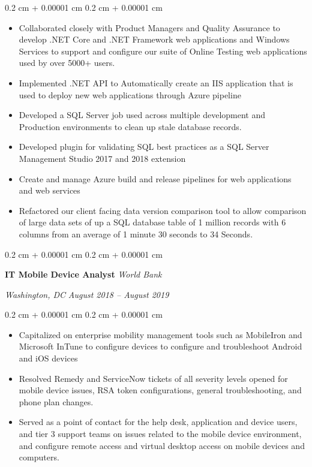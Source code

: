 \documentclass[10pt, letterpaper]{article}
\newenvironment{highlights}{
    \begin{itemize}[
        topsep=0.10 cm,
        parsep=0.10 cm,
        partopsep=0pt,
        itemsep=0pt,
        leftmargin=0.4 cm + 10pt
        ]
    }{
\end{itemize}
} %
\newenvironment{onecolentry}{
    \begin{adjustwidth}{
            0.2 cm + 0.00001 cm
        }{
            0.2 cm + 0.00001 cm
        }
    }{
    \end{adjustwidth}
} %
\newenvironment{twocolentry}[2][]{
    \onecolentry
    \def\secondColumn{#2}
    \setcolumnwidth{\fill, 10.5 cm}
    \begin{paracol}{2}
    }{
        \switchcolumn \raggedleft \secondColumn
    \end{paracol}
    \endonecolentry
} %
\begin{document}
    \begin{onecolentry}
        \begin{highlights}
        \item Collaborated closely with Product Managers and Quality Assurance to develop .NET Core and .NET Framework web applications and Windows Services to support and configure our suite of Online Testing web applications used by over 5000+ users.
        \item Implemented .NET API to Automatically create an IIS application that is used to deploy new web applications through Azure pipeline
        \item Developed a SQL Server job used across multiple development and Production environments to clean up stale database records.
        \item Developed plugin for validating SQL best practices as a SQL Server Management Studio 2017 and 2018 extension
        \item Create and manage Azure build and release pipelines for web applications and web services
        \item Refactored our client facing data version comparison tool to allow comparison of large data sets of up a SQL database table of 1 million records with 6 columns from an average of 1 minute 30 seconds to  34 Seconds.
        \end{highlights}
    \end{onecolentry}
    \begin{twocolentry}{
        \textit{Washington, DC}
        \textit{August 2018 – August 2019}}
        \textbf{IT Mobile Device Analyst}
        \textit{World Bank}
    \end{twocolentry}
    \vspace{0.10 cm}
    \begin{onecolentry}
        \begin{highlights}
        \item Capitalized on enterprise mobility management tools such as MobileIron and Microsoft InTune to configure devices to configure and troubleshoot Android and iOS devices
        \item Resolved Remedy and ServiceNow tickets of all severity levels opened for mobile device issues, RSA token configurations, general troubleshooting, and phone plan changes.
        \item Served as a point of contact for the help desk, application and device users, and tier 3 support
            teams on issues related to the mobile device environment, and configure remote access and virtual desktop
            access on mobile devices and computers.
        \end{highlights}
    \end{onecolentry}
\end{document}
